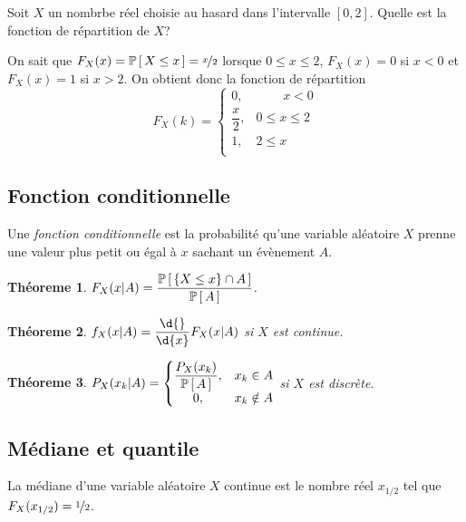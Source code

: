 \documentclass[11pt]{article}
\renewcommand\P[1]{%
	\ensuremath{%
		\mathbb{P}\left[\,#1\,\right]%
	}%
}%
\newtheorem{theoreme}{Théoreme}[section]
\begin{document}
\begin{exemple}
	Soit $X$ un nombrbe réel choisie au hasard dans l'intervalle $[0,2]$.
	Quelle est la fonction de répartition de $X$?

	On sait que $F_X(x)=\P{X\leq x}=\nicefrac{x}{2}$ lorsque $0\leq x\leq 2$,
	$F_X(x)=0$ si $x<0$ et $F_X(x)=1$ si $x>2$. On obtient donc la fonction de
	répartition
	\begin{equation*}
		F_X(k)=\left\{
			\begin{matrix}
				0,            & \phantom{0\;\leq}x<0\\
				\dfrac{x}{2}, & 0\leq x\leq 2\\
				1,            & 2\leq x\phantom{\leq 0\;}\\
			\end{matrix}
		\right.
	\end{equation*}
\end{exemple}

\subsection{Fonction conditionnelle}
\begin{definition}
	Une \textit{fonction conditionnelle} est la probabilité qu'une variable
	aléatoire $X$ prenne une valeur plus petit ou égal à  $x$ sachant un
	évènement $A$.
\end{definition}

\begin{theoreme}
	$F_X(x|A)=\dfrac{\P{\left\{X\leq x\right\}\cap A}}{\P{A}}$.
\end{theoreme}

\begin{theoreme}
	$f_X(x|A)=\dfrac{\d{}}{\d{x}}F_X(x|A)$ si $X$ est continue.
\end{theoreme}

\begin{theoreme}
	$P_X(x_k|A)=
	\left\{
		\begin{matrix}
			\dfrac{P_X(x_k)}{\P{A}}, & x_k\in A\\
			0, & x_k\notin A\\
		\end{matrix}
	\right.$
	si $X$ est discrète.
\end{theoreme}

\subsection{Médiane et quantile}
\begin{definition}
	La médiane d'une variable aléatoire $X$ continue est le nombre réel
	$x_{1/2}$ tel que $F_X(x_{1/2})=\nicefrac{1}{2}$.
\end{definition}
\end{document}
